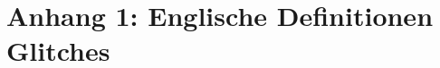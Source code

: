 


\appendix
\chapter{Anhang 1: Englische Definitionen Glitches}\label{chap.anhang_dictionaire}
 
 






\newpage
